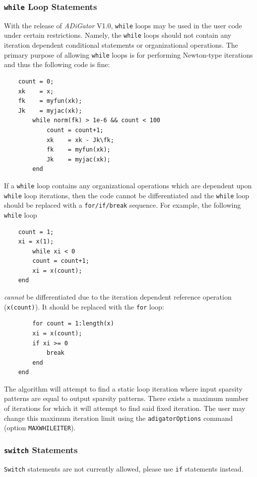 \documentclass[10pt,pdftex]{article}
\begin{document}
\subsubsection{\texttt{while} Loop Statements}
With the release of {\em ADiGator} V1.0, \texttt{while} loops may be used in the user code under certain restrictions.
Namely, the \texttt{while} loops should not contain any iteration dependent conditional statements or organizational operations.
The primary purpose of allowing \texttt{while} loops is for performing Newton-type iterations and thus the following code is fine:
\begin{verbatim}
    count = 0;
    xk    = x;
    fk    = myfun(xk);
    Jk    = myjac(xk);
    	while norm(fk) > 1e-6 && count < 100
    	    count = count+1;
    	    xk    = xk - Jk\fk;
    	    fk    = myfun(xk);
    	    Jk    = myjac(xk);
    	end
\end{verbatim}
If a \texttt{while} loop contains any organizational operations which are dependent upon \texttt{while} loop iterations, then the code cannot be differentiated and the \texttt{while} loop should be replaced with a \texttt{for/if/break} sequence.
For example, the following \texttt{while} loop
\begin{verbatim}
    count = 1;
    xi = x(1);
    	while xi < 0
        count = count+1;
        xi = x(count);
    end
\end{verbatim}
{\em cannot} be differentiated due to the iteration dependent reference operation (\texttt{x(count)}). It should be replaced with the \texttt{for} loop:
\begin{verbatim}
    	for count = 1:length(x)
        xi = x(count);
        if xi >= 0
            break
        end
    end
\end{verbatim}
The algorithm will attempt to find a static loop iteration where input sparsity patterns are equal to output sparsity patterns. There exists a maximum number of iterations for which it will attempt to find said fixed iteration. The user may change this maximum iteration limit using the \texttt{adigatorOptions} command (option \texttt{MAXWHILEITER}).

\subsubsection{\texttt{switch} Statements}
\texttt{Switch} statements are not currently allowed, please use \texttt{if} statements instead.
\end{document}
